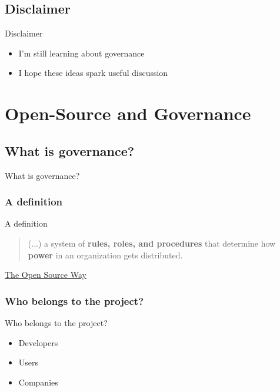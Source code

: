 \documentclass[aspectratio=169]{beamer}
\newcommand{\sectiondivider}{%
  \begin{frame}[plain]
    \centering
    \vfill
    {\usebeamercolor[fg]{title}\Huge\bfseries\insertsectionhead\par}
    \vfill
  \end{frame}
}
\begin{document}
\subsection{Disclaimer}
\begin{frame}{Disclaimer}
  \Large
  \begin{itemize}
    \setlength{\itemsep}{1em}
    \item I'm still learning about governance
    \item I hope these ideas spark useful discussion
  \end{itemize}
\end{frame}

\section{Open-Source and Governance}
\sectiondivider

\subsection{What is governance?}
\begin{frame}{What is governance?}
\end{frame}

\subsubsection{A definition}
\begin{frame}{A definition}
  \begin{quote}
    \Large
    (...) a system of \textbf{rules, roles, and procedures} that determine how \textbf{power}
    in an organization gets distributed.
  \end{quote}
  \vfill
  {\scriptsize \href{https://guidebook.theopensourceway.org/growing-contributors/project-and-community-governance}
    {The Open Source Way}}
\end{frame}

\subsubsection{Who belongs to the project?}
\begin{frame}{Who belongs to the project?}
  \Large
  \begin{itemize}
    \setlength{\itemsep}{1em}
    \item Developers
    \item Users
    \item Companies
  \end{itemize}
\end{frame}
\end{document}
